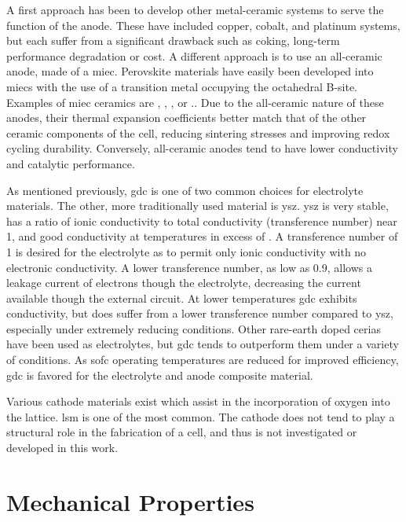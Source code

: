 A first approach has been to develop other metal-ceramic systems to serve the function of the anode.
These have included copper, cobalt, and platinum systems, but each suffer from a significant drawback such as coking, long-term performance degradation or cost.
A different approach is to use an all-ceramic anode, made of a \gls{miec}.
Perovskite materials have easily been developed into \glspl{miec} with the use of a transition metal occupying the octahedral B-site.
Examples of \gls{miec} ceramics are , , , or .\cite{Goodenough2007,Zha2005,Primdahl2001,Hussain2013,MohammedHussain2012,Hussain2016,Huang2006}.
Due to the all-ceramic nature of these anodes, their thermal expansion coefficients better match that of the other ceramic components of the cell, reducing sintering stresses and improving redox cycling durability.
Conversely, all-ceramic anodes tend to have lower conductivity and catalytic performance.

As mentioned previously, \gls{gdc} is one of two common choices for electrolyte materials.
The other, more traditionally used material is \gls{ysz}.
\Gls{ysz} is very stable, has a ratio of ionic conductivity to total conductivity (transference number) near 1, and good conductivity at temperatures in excess of .
A transference number of 1 is desired for the electrolyte as to permit only ionic conductivity with no electronic conductivity.
A lower transference number, as low as 0.9, allows a leakage current of electrons though the electrolyte, decreasing the current available though the external circuit.%
At lower temperatures \gls{gdc} exhibits conductivity, but does suffer from a lower transference number compared to \gls{ysz}, especially under extremely reducing conditions.
Other rare-earth doped cerias have been used as electrolytes, but \gls{gdc} tends to outperform them under a variety of conditions.
As \gls{sofc} operating temperatures are reduced for improved efficiency, \gls{gdc} is favored for the electrolyte and anode composite material.

Various cathode materials exist which assist in the incorporation of oxygen into the lattice.
\Gls{lsm} is one of the most common.
The cathode does not tend to play a structural role in the fabrication of a cell, and thus is not investigated or developed in this work.

\section{Mechanical Properties}


